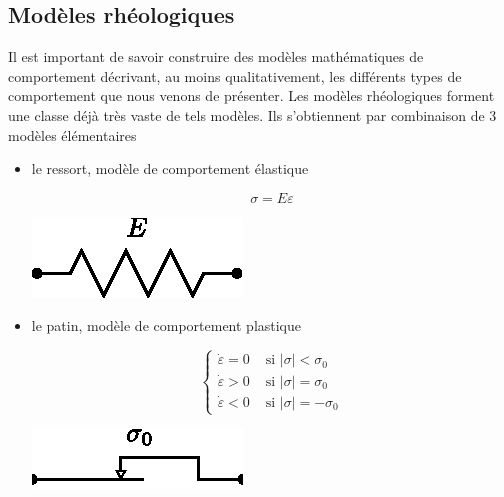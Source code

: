 \subsection{Modèles rhéologiques}
Il est important de savoir construire des modèles mathématiques de comportement décrivant, au moins qualitativement, les différents types de comportement que nous venons de présenter.
Les modèles rhéologiques forment une classe déjà très vaste de tels modèles.
Ils s'obtiennent par combinaison de 3 modèles élémentaires
\begin{itemize}
    \item le ressort, modèle de comportement élastique
        \begin{multicols}{2}
            \begin{equation}
                \sigma = E \varepsilon
                \label{eq:Ch04-039}
            \end{equation}
            \columnbreak
            \begin{center}
                \includegraphics{../images/T1_Ch04-0022}
            \end{center}
        \end{multicols}
    \item le patin, modèle de comportement plastique
        \begin{multicols}{2}
            \begin{equation}
                \begin{cases}
                    \dot\varepsilon = 0 & \text{ si } |\sigma|<\sigma_0 \\
                    \dot\varepsilon > 0 & \text{ si } |\sigma|=\sigma_0 \\
                    \dot\varepsilon < 0 & \text{ si } |\sigma|=-\sigma_0
                \end{cases}
                \label{eq:Ch04-040}
            \end{equation}
            \columnbreak
            \begin{center}
                \includegraphics{../images/T1_Ch04-0023}

\end{center}
\end{multicols}
\end{itemize}
